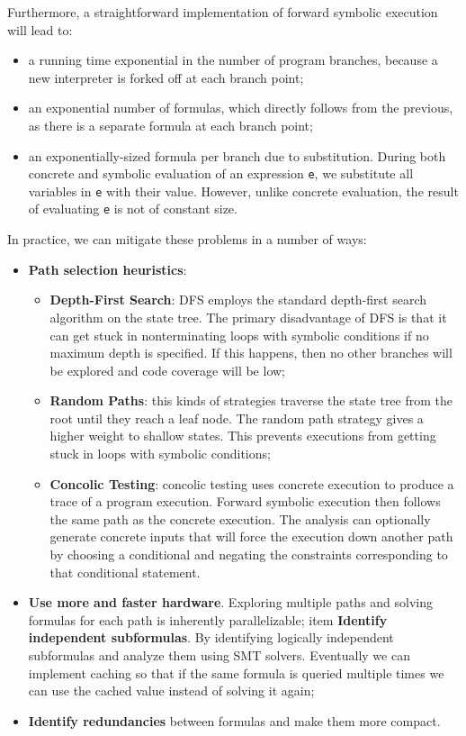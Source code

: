 Furthermore, a straightforward implementation of forward symbolic execution will lead to:
\begin{itemize}
	\item a running time exponential in the number of program branches, because a new interpreter is forked off at each branch point;
	\item an exponential number of formulas, which directly follows from the previous, as there is a separate formula at each branch point;
	\item an exponentially-sized formula per branch due to substitution. During both concrete and symbolic evaluation of an expression \texttt{e}, we substitute all variables in \texttt{e} with their value. However, unlike concrete evaluation, the result of evaluating \texttt{e} is not of constant size.
\end{itemize}
In practice, we can mitigate these problems in a number of ways:
\begin{itemize}
	\item \textbf{Path selection heuristics}:
	\begin{itemize}
		\item \textbf{Depth-First Search}: DFS employs the standard depth-first search algorithm on the state tree. The primary disadvantage of DFS is that it can get stuck in nonterminating loops with symbolic conditions if no maximum depth is specified. If this happens, then no other branches will be explored and code coverage will be low;
		\item \textbf{Random Paths}: this kinds of strategies traverse the state tree from the root until they reach a leaf node. The random path strategy gives a higher weight to shallow states. This prevents executions from getting stuck in loops with symbolic conditions;
		\item \textbf{Concolic Testing}: concolic testing uses concrete execution to produce a trace of a program execution. Forward symbolic execution then follows the same path as the concrete execution. The analysis can optionally generate concrete inputs that will force the execution down another path by choosing a conditional and negating the constraints corresponding to that conditional statement.
	\end{itemize}
	\item \textbf{Use more and faster hardware}. Exploring multiple paths and solving formulas for each path is inherently parallelizable;
	item \textbf{Identify independent subformulas}. By identifying logically independent subformulas and analyze them using SMT solvers. Eventually we can implement caching so that if the same formula is queried multiple times we can use the cached value instead of solving it again;
	\item \textbf{Identify redundancies} between formulas and make them more compact.
\end{itemize}

